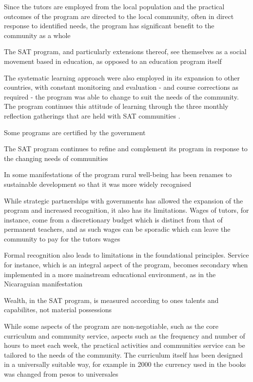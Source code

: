 Since the tutors are employed from the local population and the practical outcomes of the program are directed to the local community, often in direct response to identified needs, the program has significant benefit to the community as a whole \citep{Kwauk2016} %

The SAT program, and particularly extensions thereof, see themselves as a social movement based in education, as opposed to an education program itself \citep{Kwauk2016}

The systematic learning approach were also employed in its expansion to other countries, with constant monitoring and evaluation - and course corrections as required - the program was able to change to suit the needs of the community. The program continues this attitude of learning through the three monthly reflection gatherings that are held with SAT communities \citep{Kwauk2016}.

Some programs are certified by the government \citep{Kwauk2016}

The SAT program continues to refine and complement its program in response to the changing needs of communities \citep{Kwauk2016}

In some manifestations of the program rural well-being has been renames to sustainable development so that it was more widely recognised \citep{Kwauk2016}

While strategic partnerships with governments has allowed the expansion of the program and increased recognition, it also has its limitations. Wages of tutors, for instance, come from a discretionary budget which is distinct from that of permanent teachers, and as such wages can be sporadic which can leave the community to pay for the tutors wages  \citep{Kwauk2016}%

Formal recognition also leads to limitations in the foundational principles. Service for instance, which is an integral aspect of the program, becomes secondary when implemented in a more mainstream educational environment, as in the Nicaraguian manifestation \citep{Kwauk2016}

Wealth, in the SAT program, is measured according to ones talents and capabilites, not material possessions \citep{Kwauk2016}

While some aspects of the program are non-negotiable, such as the core curriculum and community service, aspects such as the frequency and number of hours to meet each week, the practical activities and communities service can be tailored to the needs of the community. The curriculum itself has been designed in a universally suitable way, for example in 2000 the currency used in the books was changed from pesos to universales \citep{Kwauk2016}

